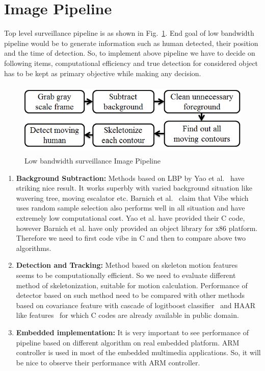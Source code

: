 \section{Image Pipeline}
\indent Top level surveillance pipeline is as shown in
Fig.~\ref{image_pipeline}. End goal of low bandwidth pipeline would be
to generate information such as human detected, their position and the
time of detection. So, to implement above pipeline we have to decide on
following items, computational efficiency and true detection for
considered object has to be kept as primary objective while making any
decision.
\begin{figure}[!b]
\centering
\includegraphics[height=100pt]{Figures/image_pipeline}
\caption{Low bandwidth surveillance Image Pipeline}
\label{image_pipeline}
\end{figure}
\begin{enumerate}
\item \textbf{Background Subtraction:} Methods based on LBP by Yao et
	al.~\cite{11} have striking nice result. It works superbly with
	varied background situation like wavering tree, moving escalator
	etc. Barnich et al.~\cite{9} claim that Vibe which uses random
	sample selection also performs well in all situation and have
	extremely low computational cost. Yao et al. have provided their
	C code, however Barnich et al.  have only provided an object
	library for x86 platform. Therefore we need to first code vibe
	in C and then to compare above two algorithms.
\item \textbf{Detection and Tracking:} Method based on skeleton motion
	features~\cite{32, 22, 31} seems to be computationally
	efficient. So we need to evaluate different method of
	skeletonization, suitable for motion calculation. Performance of
	detector based on such method need to be compared with other
	methods based on covariance feature with cascade of logitboost
	classifier~\cite{19}  and HAAR like features~\cite{17} for
	which C codes are already available in public domain.
\item \textbf{Embedded implementation:} It is very important to see
	performance of pipeline based on different algorithm on real
	embedded platform. ARM controller is used in most of the
	embedded multimedia applications. So, it will be nice to observe
	their performance with ARM controller.
\end{enumerate}
